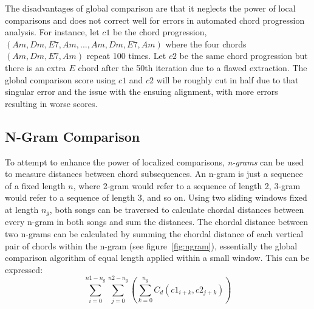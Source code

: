 The disadvantages of global comparison are that it neglects the power of local comparisons and does not correct well for errors in automated chord progression analysis. For instance, let ${c1}$ be the chord progression, $(Am, Dm, E7, Am, ... , Am, Dm, E7, Am)$ where the four chords $(Am, Dm, E7, Am)$ repeat 100 times. Let ${c2}$ be the same chord progression but there is an extra $E$ chord after the 50th iteration due to a flawed extraction. The global comparison score using ${c1}$ and ${c2}$ will be roughly cut in half due to that singular error and the issue with the ensuing alignment, with more errors resulting in worse scores.

\subsection{N-Gram Comparison}

To attempt to enhance the power of localized comparisons, \textit{n-grams} can be used to measure distances between chord subsequences. An n-gram is just a sequence of a fixed length $n$, where 2-gram would refer to a sequence of length 2, 3-gram would refer to a sequence of length 3, and so on. Using two sliding windows fixed at length $n_g$, both songs can be traversed to calculate chordal distances between every n-gram in both songs and sum the distances. The chordal distance between two n-grams can be calculated by summing the chordal distance of each vertical pair of chords within the n-gram (see figure~\ref{fig:ngram}), essentially the global comparison algorithm of equal length applied within a small window. This can be expressed: \[\sum_{i=0}^{n1 - n_g} \sum_{j=0}^{n2 - n_g} \left( \sum_{k=0}^{n_g} C_d({c1}_{i+k}, {c2}_{j+k}) \right) \]
